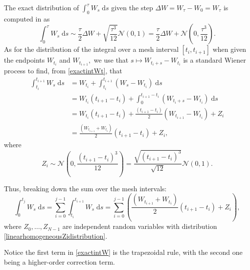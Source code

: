 \documentclass[reqno,12pt]{amsart}
\theoremstyle{plain} %
\theoremstyle{definition} %
\begin{document}
The exact distribution of $\int_0^\tau W_s\;\mathrm{d}s$ given the step $\Delta W = W_\tau - W_0 = W_\tau$ is computed in \cite[Section 14.2]{HanKloeden2017} as
\begin{equation}
    \label{exactintWt}
    \int_0^{\tau} W_s\;\mathrm{d}s \sim \frac{\tau}{2}\Delta W + \sqrt{\frac{\tau^3}{12}}\mathcal{N}(0, 1) = \frac{\tau}{2}\Delta W + \mathcal{N}\left(0, \frac{\tau^3}{12}\right).
\end{equation}
As for the distribution of the integral over a mesh interval $[t_i, t_{i+1}]$ when given the endpoints $W_{t_i}$ and $W_{t_{i+1}},$ we use that $s \mapsto W_{t_i+s} - W_{t_i}$ is a standard Wiener process to find, from \eqref{exactintWt}, that
\begin{align*}
    \int_{t_i}^{t_{i+1}} W_s\;\mathrm{d}s & = W_{t_i} + \int_{t_i}^{t_{i+1}} (W_s - W_{t_i})\;\mathrm{d}s \\
    & = W_{t_i}(t_{i+1} - t_i) + \int_{0}^{t_{i+1} - t_i} (W_{t_i+s} - W_{t_i})\;\mathrm{d}s \\
    & = W_{t_i}(t_{i+1} - t_i) + \frac{(t_{i+1} - t_i)}{2}(W_{t_{i+1}}-W_{t_{i}}) + Z_i \\
    & = \frac{(W_{t_{i+1}}+W_{t_{i}})}{2}(t_{i+1} - t_i) + Z_i,
\end{align*}
where
\begin{equation}
    \label{linearhomogeneousZidistribution}
    Z_i \sim \mathcal{N}\left(0, \frac{(t_{i+1}- t_i)^3}{12}\right) = \frac{\sqrt{(t_{i+1} - t_i)^3}}{\sqrt{12}}\mathcal{N}(0, 1).
\end{equation}

Thus, breaking down the sum over the mesh intervals:
\begin{equation}
    \label{exactintW}
    \int_0^{t_j} W_s\;\mathrm{d}s = \sum_{i = 0}^{j-1} \int_{t_i}^{t_{i+1}} W_s\;\mathrm{d}s = \sum_{i=0}^{j-1} \left( \frac{(W_{t_{i+1}}+W_{t_{i}})}{2}(t_{i+1} - t_i) + Z_i\right),
\end{equation}
where $Z_0, \ldots, Z_{N-1}$ are independent random variables with distribution \eqref{linearhomogeneousZidistribution}.

Notice the first term in \eqref{exactintW} is the trapezoidal rule, with the second one being a higher-order correction term.
\end{document}
